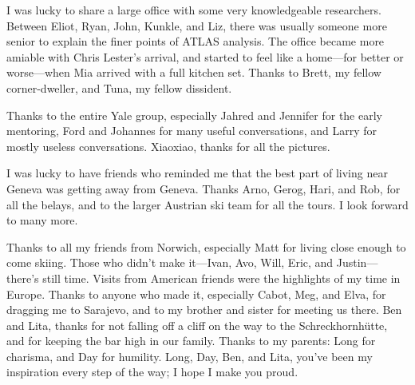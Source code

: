 I was lucky to share a large office with some very knowledgeable researchers.
Between Eliot, Ryan, John, Kunkle, and Liz, there was usually someone more senior to explain the finer points of ATLAS analysis.
The office became more amiable with Chris Lester's arrival, and started to feel like a home---for better or worse---when Mia arrived with a full kitchen set.
Thanks to Brett, my fellow corner-dweller, and Tuna, my fellow dissident.

Thanks to the entire Yale group, especially Jahred and Jennifer for the early mentoring, Ford and Johannes for many useful conversations, and Larry for mostly useless conversations. Xiaoxiao, thanks for all the pictures.


I was lucky to have friends who reminded me that the best part of living near Geneva was getting away from Geneva.
Thanks Arno, Gerog, Hari, and Rob, for all the belays, and to the larger Austrian ski team for all the tours. I look forward to many more.

Thanks to all my friends from Norwich, especially Matt for living close enough to come skiing. Those who didn't make it---Ivan, Avo, Will, Eric, and Justin---there's still time.
Visits from American friends were the highlights of my time in Europe. Thanks to anyone who made it, especially Cabot, Meg, and Elva, for dragging me to Sarajevo, and to my brother and sister for meeting us there. Ben and Lita, thanks for not falling off a cliff on the way to the Schreckhornh\"utte, and for keeping the bar high in our family.
Thanks to my parents: Long for charisma, and Day for humility.
Long, Day, Ben, and Lita, you've been my inspiration every step of the way; I hope I make you proud.

